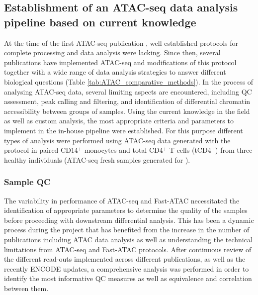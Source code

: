 \subsection{Establishment of an ATAC-seq data analysis pipeline based on current knowledge}
At the time of the first ATAC-seq publication \parencite{Buenrostro2013}, well established protocols for complete processing and data analysis were lacking. Since then, several publications have implemented ATAC-seq and modifications of this protocol together with a wide range of data analysis strategies to answer different biological questions (Table \ref{tab:ATAC_comparative_methods}).
In the process of analysing ATAC-seq data, several limiting aspects are encountered, including QC assessment, peak calling and filtering, and identification of differential chromatin accessibility between groups of samples. Using the current knowledge in the field as well as custom analysis, the most appropriate criteria and parameters to implement in the in-house pipeline were established. For this purpose different types of analysis were performed using ATAC-seq data generated with the \parencite{Buenrostro2013} protocol in paired CD14$^+$ monocytes and total CD4$^+$ T cells (tCD4$^+$) from three healthy individuals (ATAC-seq fresh samples generated for \label{Core}). 


\subsubsection{Sample QC}
The variability in performance of ATAC-seq and Fast-ATAC necessitated the identification of appropriate parameters to determine the quality of the samples before proceeding with downstream differential analysis. This has been a dynamic process during the project that has benefited from the increase in the number of publications including ATAC data analysis as well as understanding the technical limitations from ATAC-seq and Fast-ATAC protocols. After continuous review of the different read-outs implemented across different publications, as well as the recently ENCODE updates, a comprehensive analysis was performed in order to identify the most informative QC measures as well as equivalence and correlation between them.

